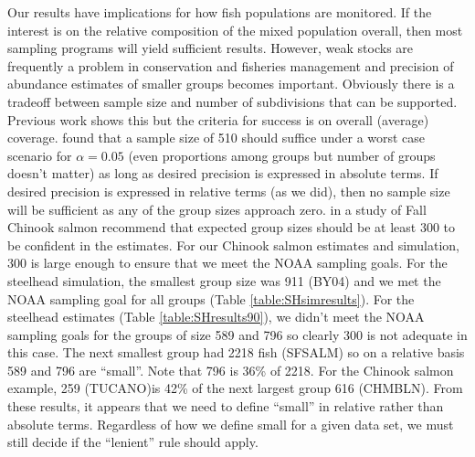 \documentclass[12pt]{article}
\begin{document}
Our results have implications for how fish populations are monitored. If the interest is on the relative composition of the  mixed population overall, then most sampling programs will yield sufficient results. However, weak stocks are frequently a problem in conservation and fisheries management and precision of abundance estimates of smaller groups becomes important.  Obviously there is a tradeoff between sample size and number of subdivisions that can be supported. Previous work \cite{Gerritsen} shows this but the criteria for success is on overall (average) coverage.  found that a sample size of 510 should suffice under a worst case scenario for $\alpha=0.05$ (even proportions among groups but number of groups doesn't matter) as long as desired precision is expressed in absolute terms. If desired precision is expressed in relative terms (as we did), then no sample size will be sufficient as any of the group sizes approach zero.  in a study of Fall Chinook salmon recommend that expected group sizes should be at least 300 to be confident in the estimates. For our Chinook salmon estimates and simulation, 300 is large enough to ensure that we meet the NOAA sampling goals.  For the steelhead simulation, the smallest group size was 911 (BY04) and we met the NOAA sampling goal for all groups (Table \ref{table:SHsimresults}).  For the steelhead estimates (Table \ref{table:SHresults90}), we didn't meet the NOAA sampling goals for the groups of size 589 and 796 so clearly 300 is not adequate in this case. The next smallest group had 2218 fish (SFSALM) so on a relative basis 589 and 796 are ``small''.  Note that 796 is 36\% of 2218.  For the Chinook salmon example, 259 (TUCANO)is 42\% of the next largest group 616 (CHMBLN).  From these results, it appears that we need to define ``small'' in relative rather than absolute terms.  Regardless of how we define small for a given data set, we must still decide if the ``lenient'' rule should apply.
\end{document}
